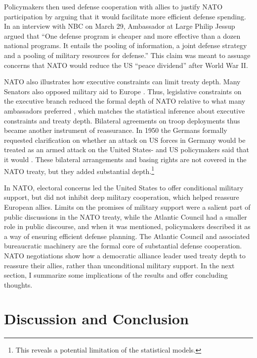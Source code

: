\documentclass[12pt]{article}
\begin{document}
Policymakers then used defense cooperation with allies to justify NATO participation by arguing that it would facilitate more efficient defense spending. 
In an interview with NBC on March 29, Ambassador at Large Philip Jessup argued that ``One defense program is cheaper and more effective than a dozen national programs. It entails the pooling of information, a joint defense strategy and a pooling of military resources for defense.''
This claim was meant to assuage concerns that NATO would reduce the US ``peace dividend'' after World War II. 


NATO also illustrates how executive constraints can limit treaty depth. 
Many Senators also opposed military aid to Europe \citep[pg 285]{Acheson1969}. 
Thus, legislative constraints on the executive branch reduced the formal depth of NATO relative to what many ambassadors preferred \citep[pg 277]{Acheson1969}, which matches the statistical inference about executive constraints and treaty depth.  
Bilateral agreements on troop deployments thus became another instrument of reassurance. 
In 1950 the Germans formally requested clarification on whether an attack on US forces in Germany would be treated as an armed attack on the United States- and US policymakers said that it would \citep[pg. 395]{Acheson1969}.  
These bilateral arrangements and basing rights are not covered in the NATO treaty, but they added substantial depth.\footnote{This reveals a potential limitation of the statistical models.}  


In NATO, electoral concerns led the United States to offer conditional military support, but did not inhibit deep military cooperation, which helped reassure European allies. 
Limits on the promises of military support were a salient part of public discussions in the NATO treaty, while the Atlantic Council had a smaller role in public discourse, and when it was mentioned, policymakers described it as a way of ensuring efficient defense planning. 
The Atlantic Council and associated bureaucratic machinery are the formal core of substantial defense cooperation. 
NATO negotiations show how a democratic alliance leader used treaty depth to reassure their allies, rather than unconditional military support. 
In the next section, I summarize some implications of the results and offer concluding thoughts. 



\section{Discussion and Conclusion} 
\end{document}
